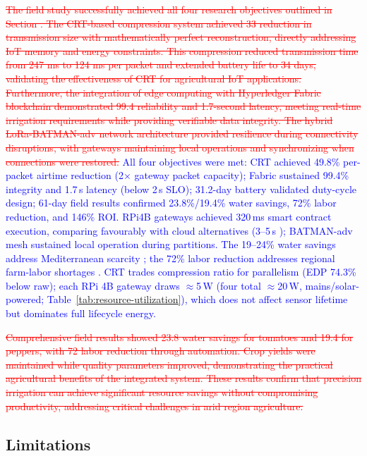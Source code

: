 \documentclass[pdflatex,sn-mathphys-num]{sn-jnl}
\theoremstyle{thmstyleone}
\theoremstyle{thmstyletwo}
\theoremstyle{thmstylethree}
\begin{document}
{\textcolor{red}{\sout{The field study successfully achieved all four research objectives outlined in Section . The CRT-based compression system achieved 33 reduction in transmission size with mathematically perfect reconstruction, directly addressing IoT memory and energy constraints. This compression reduced transmission time from 247 ms to 124 ms per packet and extended battery life to 34 days, validating the effectiveness of CRT for agricultural IoT applications. Furthermore, the integration of edge computing with Hyperledger Fabric blockchain demonstrated 99.4 reliability and 1.7-second latency, meeting real-time irrigation requirements while providing verifiable data integrity. The hybrid LoRa-BATMAN-adv network architecture provided resilience during connectivity disruptions, with gateways maintaining local operations and synchronizing when connections were restored.}}
\textcolor{blue}{All four objectives were met: CRT achieved 49.8\% per-packet airtime reduction (2$\times$ gateway packet capacity); Fabric sustained 99.4\% integrity and 1.7\,s latency (below 2\,s SLO); 31.2-day battery validated duty-cycle design; 61-day field results confirmed 23.8\%/19.4\% water savings, 72\% labor reduction, and 146\% ROI. RPi4B gateways achieved 320\,ms smart contract execution, comparing favourably with cloud alternatives (3--5\,s \cite{liu2019edge}); BATMAN-adv mesh sustained local operation during partitions. The 19--24\% water savings address Mediterranean scarcity \cite{benali2024tunisiaWater,adeloye2021tunisiaAgro,brooks2019precisionWater,williams2022savings}; the 72\% labor reduction addresses regional farm-labor shortages \cite{miller2020climateImpact}. CRT trades compression ratio for parallelism (EDP 74.3\% below raw); each RPi 4B gateway draws $\approx$5\,W (four total $\approx$20\,W, mains/solar-powered; Table~\ref{tab:resource-utilization}), which does not affect sensor lifetime but dominates full lifecycle energy.}

\textcolor{red}{\sout{Comprehensive field results showed 23.8 water savings for tomatoes and 19.4 for peppers, with 72 labor reduction through automation. Crop yields were maintained while quality parameters improved, demonstrating the practical agricultural benefits of the integrated system. These results confirm that precision irrigation can achieve significant resource savings without compromising productivity, addressing critical challenges in arid region agriculture.}}
\subsection{Limitations}
\label{subsec:limitations}

}
\end{document}
